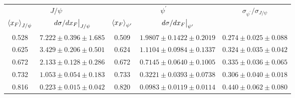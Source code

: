 \begin{tabular}{cc|cc|c}
\hline
\multicolumn{2}{c|}{$J/\psi$} &
  \multicolumn{2}{c|}{$\psi^{\prime}$} &
  \multirow{2}{*}{$\sigma_{\psi^\prime}/\sigma_{J/\psi}$} \\ \cline{1-4}
$\expval{x_F}_{J/\psi}$ &
  $\eval{d\sigma/dx_F}_{J/\psi}$ &
  $\expval{x_F}_{\psi^\prime}$ &
  $\eval{d\sigma/dx_F}_{\psi^\prime}$ &
   \\ \hline
\multicolumn{1}{c|}{0.528} &
  $7.222\pm0.396\pm1.685$ &
  \multicolumn{1}{c|}{0.509} &
  $1.9807\pm0.1422\pm0.2019$ &
  $0.274\pm0.025\pm0.088$ \\
\multicolumn{1}{c|}{0.625} &
  $3.429\pm0.206\pm0.501$ &
  \multicolumn{1}{c|}{0.624} &
  $1.1104\pm0.0984\pm0.1337$ &
  $0.324\pm0.035\pm0.042$ \\
\multicolumn{1}{c|}{0.672} &
  $2.133\pm0.128\pm0.286$ &
  \multicolumn{1}{c|}{0.672} &
  $0.7145\pm0.0640\pm0.1005$ &
  $0.335\pm0.036\pm0.065$ \\
\multicolumn{1}{c|}{0.732} &
  $1.053\pm0.054\pm0.183$ &
  \multicolumn{1}{c|}{0.733} &
  $0.3221\pm0.0393\pm0.0738$ &
  $0.306\pm0.040\pm0.018$ \\
\multicolumn{1}{c|}{0.816} &
  $0.223\pm0.015\pm0.042$ &
  \multicolumn{1}{c|}{0.820} &
  $0.0983\pm0.0119\pm0.0114$ &
  $0.440\pm0.062\pm0.080$ \\ \hline
\end{tabular}
